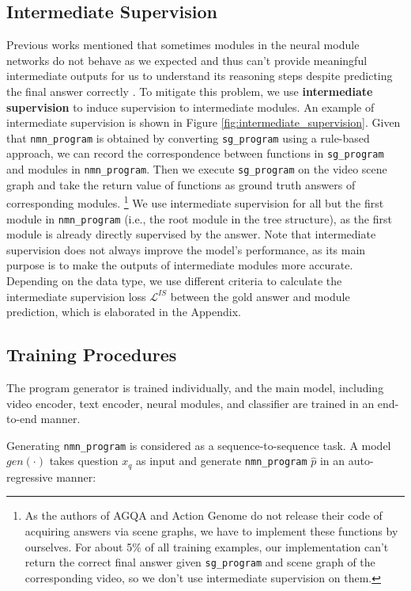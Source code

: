 \documentclass[letterpaper]{article} %
\begin{document}
\subsection{Intermediate Supervision}
Previous works mentioned that sometimes modules in the neural module networks do not behave as we expected and thus can't provide meaningful intermediate outputs for us to understand its reasoning steps despite predicting the final answer correctly \cite{Hu2017LearningTR}. To mitigate this problem, we use \textbf{intermediate supervision} to induce supervision to intermediate modules. An example of intermediate supervision is shown in Figure \ref{fig:intermediate_supervision}.
Given that \texttt{nmn\_program} is obtained by converting \texttt{sg\_program} using a rule-based approach, we can record the correspondence between functions in \texttt{sg\_program} and modules in \texttt{nmn\_program}. Then we execute \texttt{sg\_program} on the video scene graph and take the return value of functions as ground truth answers of corresponding modules. \footnote{As the authors of AGQA and Action Genome do not release their code of acquiring answers via scene graphs, we have to implement these functions by ourselves. For about 5\% of all training examples, our implementation can't return the correct final answer given \texttt{sg\_program} and scene graph of the corresponding video, so we don't use intermediate supervision on them.} We use intermediate supervision for all but the first module in \texttt{nmn\_program} (i.e., the root module in the tree structure), as the first module is already directly supervised by the answer. Note that intermediate supervision does not always improve the model's performance, as its main purpose is to make the outputs of intermediate modules more accurate.
Depending on the data type, we use different criteria to calculate the intermediate supervision loss $\mathcal{L}^{IS}$ between the gold answer and module prediction, which is elaborated in the Appendix.

\subsection{Training Procedures}
The program generator is trained individually, and the main model, including video encoder, text encoder, neural modules, and classifier are trained in an end-to-end manner. 

Generating \texttt{nmn\_program} is considered as a sequence-to-sequence task. A model $gen(\cdot)$ takes question $x_q$ as input and generate \texttt{nmn\_program} $\hat{p}$ in an auto-regressive manner:
\end{document}
